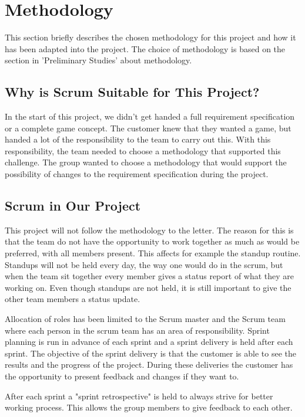 \section{Methodology}

    This section briefly describes the chosen methodology for this project and how 
    it has been adapted into the project. The choice of methodology is based on the
    section in 'Preliminary Studies' about methodology.

\subsection*{Why is Scrum Suitable for This Project?}

    In the start of this project, we didn't get handed a full requirement specification 
    or a complete game concept. The customer knew that they wanted a game, but handed a 
    lot of the responsibility to the team to carry out this. With this responsibility, 
    the team needed to choose a methodology that supported this challenge. The group 
    wanted to choose a methodology that would support the possibility of changes to the 
    requirement specification during the project. 

\subsection*{Scrum in Our Project}

    This project will not follow the methodology to the letter. The reason for this is 
    that the team do not have the opportunity to work together as much as would be 
    preferred, with all members present. This affects for example the standup routine. 
    Standups will not be held every day, the way one would do in the scrum, but when the 
    team sit together every member gives a status report of what they are working on. 
    Even though standups are not held, it is still important to give the other team 
    members a status update.

    Allocation of roles has been limited to the Scrum master and the Scrum team where 
    each person in the scrum team has an area of responsibility. Sprint planning is run 
    in advance of each sprint and a sprint delivery is held after each sprint. The 
    objective of the sprint delivery is that the customer is able to see the results 
    and the progress of the project. During these deliveries the customer has the 
    opportunity to present feedback and changes if they want to.

    After each sprint a "sprint retrospective" is held to always strive for better working 
    process. This allows the group members to give feedback to each other.

